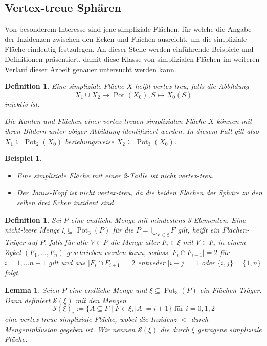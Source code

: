 \documentclass[12pt,titlepage,twoside,cleardoublepage]{article}
\theoremstyle{nummermitklammern}
\newtheorem{lemma}[temp]{Lemma}
\newtheorem{bsp}[temp]{Beispiel}
\newtheorem{definition}[temp]{Definition}
\newtheorem{definition}[zahl]{Definition}
\newtheorem{lemma}[zahl]{Lemma}
\newtheorem{bsp}[zahl]{Beispiel}
\numberwithin{equation}{section}
\DeclareMathOperator{\Pot}{Pot}
\begin{document}
\subsection{Vertex-treue Sphären}
Von besonderem Interesse sind jene simpliziale Flächen, für welche die Angabe der Inzidenzen zwischen den Ecken und Flächen ausreicht, um die simpliziale Fläche eindeutig festzulegen. An dieser Stelle werden einführende Beispiele und Definitionen präsentiert, damit diese Klasse von simplizialen Flächen im weiteren Verlauf dieser Arbeit genauer untersucht werden kann.
\begin{definition}
Eine simpliziale Fläche $X$ heißt \emph{vertex-treu}, falls die Abbildung
\[
X_1 \cup X_2 \to \Pot(X_0),S \mapsto X_0(S)
\]
 injektiv ist. 

Die Kanten und Flächen einer vertex-treuen simplizialen Fläche $X$ können  mit ihren Bildern unter obiger Abbildung identifiziert werden. In diesem Fall gilt also $X_1 \subseteq \Pot_2(X_0)$ beziehungsweise $X_2\subseteq \Pot_3(X_0)$. 
\end{definition}
\begin{bsp}
\begin{itemize}
\item Eine simpliziale Fläche mit einer 2-Taille ist nicht vertex-treu.
\item Der Janus-Kopf ist nicht vertex-treu, da die beiden Flächen der Sphäre  zu den selben drei Ecken inzident sind.
\end{itemize}
\end{bsp}
\begin{definition}
Sei $P$ eine endliche Menge mit mindestens 3 Elementen. Eine nicht-leere Menge $\xi \subseteq \Pot_3(P)$ für die $P=\bigcup_{F\in \xi} F$ gilt, heißt ein \emph{Flächen-Träger} auf $P$, falls für alle $V\in P$ die Menge aller $F_i \in \xi$ mit $V \in F_i$ in einem Zykel  $(F_1,\ldots ,F_n)$ geschrieben werden kann, sodass $\vert F_i \cap F_{i+1}\vert=2 $ für $i=1,\ldots n-1$ gilt und aus $\vert F_i \cap F_{i+1}\vert=2$ entweder $\vert i-j\vert =1$ oder $\{i,j\}=\{1,n\}$ folgt.  
\end{definition}
\begin{lemma}
Seien $P$ eine endliche Menge und $\xi \subseteq \Pot_3(P)$ ein Flächen-Träger. Dann definiert $\mathcal{S}(\xi)$ mit den Mengen 
\[
\mathcal{S}(\xi)_i:=\{A\subseteq F\mid F\in \xi,\vert A\vert=i+1\}\text{ für }i=0,1,2 
\]eine vertex-treue simpliziale Fläche, wobei die Inzidenz $<$ durch Mengeninklusion gegeben ist. Wir nennen $\mathcal{S}(\xi)$ die durch $\xi$ \emph{getragene} simpliziale Fläche.
\end{lemma}
\end{document}
